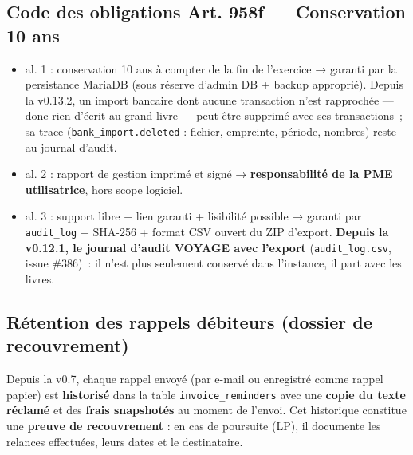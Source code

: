 \documentclass[a4paper,11pt,oneside]{article}
\begin{document}
\subsection{Code des obligations Art. 958f — Conservation 10 ans}

\begin{itemize}
    \item al. 1 : conservation 10 ans à compter de la fin de l'exercice → garanti par la persistance MariaDB (sous réserve d'admin DB + backup approprié). Depuis la v0.13.2, un import bancaire dont aucune transaction n'est rapprochée --- donc rien d'écrit au grand livre --- peut être supprimé avec ses transactions~; sa trace (\texttt{bank\_import.deleted} : fichier, empreinte, période, nombres) reste au journal d'audit.
    \item al. 2 : rapport de gestion imprimé et signé → \textbf{responsabilité de la PME utilisatrice}, hors scope logiciel.
    \item al. 3 : support libre + lien garanti + lisibilité possible → garanti par \texttt{audit\_log} + SHA-256 + format CSV ouvert du ZIP d'export. \textbf{Depuis la v0.12.1, le journal d'audit VOYAGE avec l'export} (\texttt{audit\_log.csv}, issue \#386)~: il n'est plus seulement conservé dans l'instance, il part avec les livres.
\end{itemize}

\subsection{Rétention des rappels débiteurs (dossier de recouvrement)}\label{sec:dunning-retention}

Depuis la v0.7, chaque rappel envoyé (par e-mail ou enregistré comme rappel papier) est \textbf{historisé} dans la table \texttt{invoice\_reminders} avec une \textbf{copie du texte réclamé} et des \textbf{frais snapshotés} au moment de l'envoi. Cet historique constitue une \textbf{preuve de recouvrement} : en cas de poursuite (LP), il documente les relances effectuées, leurs dates et le destinataire.
\end{document}
